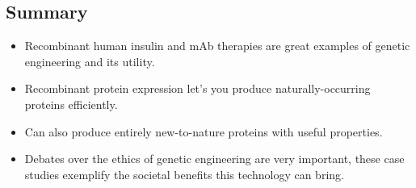 \subsection{Summary}
\begin{itemize}
    \item Recombinant human insulin and mAb therapies are great examples of genetic engineering and its utility.
    \item Recombinant protein expression let’s you produce naturally-occurring proteins efficiently.
    \item Can also produce entirely new-to-nature proteins with useful properties.
    \item Debates over the ethics of genetic engineering are very important, these case studies exemplify the societal benefits this technology can bring.
\end{itemize}

